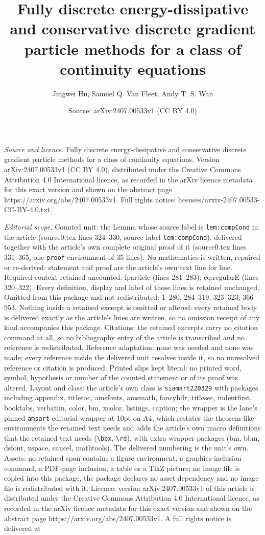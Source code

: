 \documentclass[10pt,a4paper]{amsart}
\title[Fully discrete energy-dissipative and conservative discrete ]{Fully discrete energy-dissipative and conservative discrete gradient particle methods for a class of continuity equations}
\author{Jingwei Hu, Samuel Q. Van Fleet, Andy T. S. Wan}
\date{Source: arXiv:2407.00533v1 (CC BY 4.0)}
\begin{document}
\maketitle

\noindent\emph{Source and licence.} Fully discrete energy-dissipative and conservative discrete gradient particle methods for a class of continuity equations. Version arXiv:2407.00533v1 (CC BY 4.0), distributed under the Creative Commons Attribution 4.0 International licence, as recorded in the arXiv licence metadata for this exact version and shown on the abstract page https://arxiv.org/abs/2407.00533v1. Full rights notice: licenses/arxiv-2407.00533-CC-BY-4.0.txt.\par\smallskip

\noindent\textit{Editorial scope.} Counted unit: the Lemma whose source label is \texttt{lem:compCond} in the article (source0.tex lines 324--330, source label \texttt{lem:compCond}), delivered together with the article's own complete original proof of it (source0.tex lines 331--365, one \texttt{proof} environment of 35 lines). No mathematics is written, repaired or re-derived: statement and proof are the article's own text line for line. Required context retained uncounted: fparticle (lines 281--283); eq:regularE (lines 320--322). Every definition, display and label of those lines is retained unchanged. Omitted from this package and not redistributed: 1--280, 284--319, 323--323, 366--953. Nothing inside a retained excerpt is omitted or altered: every retained body is delivered exactly as the article's lines are written, so no omission receipt of any kind accompanies this package. Citations: the retained excerpts carry no citation command at all, so no bibliography entry of the article is transcribed and no reference is redistributed. Reference adaptation: none was needed and none was made; every reference inside the delivered unit resolves inside it, so no unresolved reference or citation is produced. Printed slips kept literal: no printed word, symbol, hypothesis or number of the counted statement or of its proof was altered. Layout and class: the article's own class is \texttt{siamart220329} with packages including appendix, titletoc, amsfonts, amsmath, fancyhdr, titlesec, indentfirst, booktabs, verbatim, color, bm, xcolor, listings, caption; the wrapper is the lane's pinned \texttt{amsart} editorial wrapper at 10pt on A4, which restates the theorem-like environments the retained text needs and adds the article's own macro definitions that the retained text needs (\texttt{\textbackslash bbx}, \texttt{\textbackslash rd}), with extra wrapper packages (bm, bbm, dsfont, xspace, cancel, mathtools). The delivered numbering is the unit's own. Assets: no retained span contains a figure environment, a graphics-inclusion command, a PDF-page inclusion, a table or a TikZ picture; no image file is copied into this package, the package declares no asset dependency and no image file is redistributed with it. Licence: version arXiv:2407.00533v1 of this article is distributed under the Creative Commons Attribution 4.0 International licence, as recorded in the arXiv licence metadata for this exact version and shown on the abstract page https://arxiv.org/abs/2407.00533v1. A full rights notice is delivered at 
\end{document}
